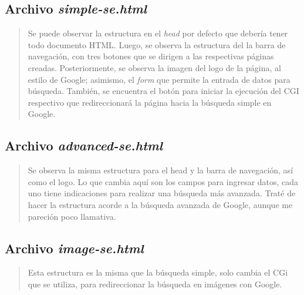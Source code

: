 \documentclass{article}
\begin{document}
  \subsection{Archivo \textit{simple-se.html}}

  

  \begin{quote}
    Se puede observar la estructura en el \textit{head} por defecto que debería tener todo documento HTML. Luego, se observa la estructura del la barra de navegación, con tres botones que se dirigen a las respectivas páginas creadas. Posteriormente, se observa la imagen del logo de la página, al estilo de Google; asimismo, el \textit{form} que permite la entrada de datos para búsqueda. También, se encuentra el botón para iniciar la ejecución del CGI respectivo que redireccionará la página hacia la búsqueda simple en Google.
  \end{quote}

  \subsection{Archivo \textit{advanced-se.html}}

  

  \begin{quote}
    Se observa la misma estructura para el head y la barra de navegación, así como el logo. Lo que cambia aquí son los campos para ingresar datos, cada uno tiene indicaciones para realizar una búsqueda más avanzada. Traté de hacer la estructura acorde a la búsqueda avanzada de Google, aunque me pareción poco llamativa.
  \end{quote}

  \subsection{Archivo \textit{image-se.html}}

  

  \begin{quote}
    Esta estructura es la misma que la búsqueda simple, solo cambia el CGi que se utiliza, para redireccionar la búsqueda en imágenes con Google.
  \end{quote}
\end{document}
